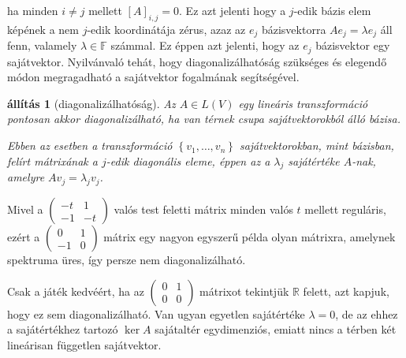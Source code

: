 \documentclass[9pt, a4paper, showtrims]{memoir}
\theoremstyle{plain}
\newtheorem{proposition}{állítás}[chapter]
\theoremstyle{remark}
\theoremstyle{definition}
\begin{document}
ha minden $i\neq j$ mellett $\left[ A \right]_{i,j}=0.$
Ez azt jelenti hogy a $j$-edik bázis elem képének a nem $j$-edik koordinátája zérus,
azaz az $e_j$ bázisvektorra $Ae_j=\lambda e_j$ áll fenn,
valamely $\lambda\in\mathbb{F}$ számmal.
Ez éppen azt jelenti,
hogy az $e_j$ bázisvektor egy sajátvektor.
Nyilvánvaló tehát,
hogy diagonalizálhatóság szükséges és elegendő módon megragadható a sajátvektor fogalmának segítségével.
\begin{proposition}[diagonalizálhatóság]
	Az $A\in L\left( V \right)$ egy lineáris transzformáció
	pontosan akkor diagonalizálható,
	ha van térnek csupa sajátvektorokból álló bázisa.

	Ebben az esetben a transzformáció $\left\{ v_1,\ldots,v_n \right\}$ sajátvektorokban, mint bázisban,
    felírt mátrixának a $j$-edik diagonális eleme,
    éppen az a $\lambda_j$ sajátértéke $A$-nak,
    amelyre $Av_j=\lambda_jv_j$.
\end{proposition}
Mivel a
\begin{math}
	\begin{pmatrix}
		-t & 1 \\-1&-t
	\end{pmatrix}
\end{math}
valós test feletti mátrix minden valós $t$ mellett reguláris,
ezért a
\begin{math}
	\begin{pmatrix}
		0 & 1 \\-1&0
	\end{pmatrix}
\end{math}
mátrix egy nagyon egyszerű példa olyan mátrixra, amelynek spektruma üres,
így persze nem diagonalizálható.

Csak a játék kedvéért, ha az
\begin{math}
	\begin{pmatrix}
		0 & 1 \\0&0
	\end{pmatrix}
\end{math}
mátrixot tekintjük $\mathbb{R}$ felett,
azt kapjuk, hogy ez sem diagonalizálható.
Van ugyan egyetlen sajátértéke $\lambda=0$,
de az ehhez a sajátértékhez tartozó $\ker A$ sajátaltér egydimenziós,
emiatt nincs a térben két lineárisan független sajátvektor.
\end{document}
